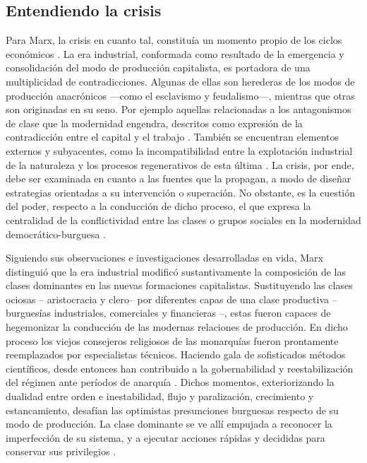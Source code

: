 \documentclass{textolivre}
\begin{document}
\subsection{Entendiendo la crisis}\label{sec-crisis}
Para Marx, la crisis en cuanto tal, constituía un momento propio de los ciclos
económicos \cite[p. 11--12]{marx2010}. La era industrial, conformada como resultado de la
emergencia y consolidación del modo de producción capitalista, es portadora de una
multiplicidad de contradicciones. Algunas de ellas son herederas de los modos de
producción anacrónicos —como el esclavismo y feudalismo—, mientras que otras son
originadas en su seno. Por ejemplo aquellas relacionadas a los antagonismos de clase
que la modernidad engendra, descritos como expresión de la contradicción entre el capital
y el trabajo \cite{wallerstein}. También se encuentran elementos
externos y subyacentes, como la incompatibilidad entre la explotación industrial de la
naturaleza y los procesos regenerativos de esta última \cite{Foster2016}. La crisis, por
ende, debe ser examinada en cuanto a las fuentes que la propagan, a modo de diseñar
estrategias orientadas a su intervención o superación. No obstante, es la cuestión del
poder, respecto a la conducción de dicho proceso, el que expresa la centralidad de la
conflictividad entre las clases o grupos sociales en la modernidad democrático-burguesa
\cite{lenin1997}.

Siguiendo sus observaciones e investigaciones desarrolladas en vida, Marx
distinguió que la era industrial modificó sustantivamente la composición de las clases
dominantes en las nuevas formaciones capitalistas. Sustituyendo las clases ociosas --
aristocracia y clero-- por diferentes capas de una clase productiva --burguesías
industriales, comerciales y financieras \cite{marx2003}--, estas fueron capaces de
hegemonizar la conducción de las modernas relaciones de producción. En dicho proceso
los viejos consejeros religiosos de las monarquías fueron prontamente reemplazados por
especialistas técnicos. Haciendo gala de sofisticados métodos científicos, desde entonces
han contribuido a la gobernabilidad y reestabilización del régimen ante períodos de
anarquía \cite{Gunderson2019}. Dichos momentos, exteriorizando la
dualidad entre orden e inestabilidad, flujo y paralización, crecimiento y estancamiento,
desafían las optimistas presunciones burguesas respecto de su modo de producción. La
clase dominante se ve allí empujada a reconocer la imperfección de su sistema, y a
ejecutar acciones rápidas y decididas para conservar sus privilegios \cite{lenin1997}.
\end{document}
